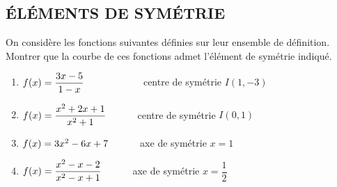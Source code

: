 



 \summary{}
 
	\subsection*{ÉLÉMENTS DE SYMÉTRIE}
\begin{exercice}
On considère les fonctions suivantes définies sur leur ensemble
de définition. Montrer que  la courbe de ces fonctions admet l'élément de symétrie indiqué.
\begin{enumerate}
\item $f(x)= \dfrac{3x-5}{1-x}\hspace*{2cm}$  centre de symétrie $ I(1, -3) $

\item $f(x)= \dfrac{x^2+2x+1}{x^2+1}\hspace*{1cm}$ centre de symétrie $ I(0, 1) $

\item $f(x)=3x^2 - 6x + 7\hspace*{1cm}$ axe de symétrie $ x=1 $

\item $f(x)=\dfrac{x^2 - x -2}{x^2 - x + 1}\hspace*{1cm}$ axe de symétrie $ x=\dfrac{1}{2} $
\end{enumerate}
\end{exercice}
